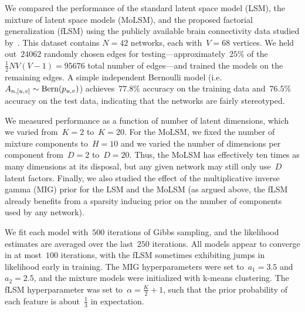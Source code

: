 We compared the performance of the standard latent space model (LSM),
the mixture of latent space models (MoLSM), and the proposed factorial
generalization (fLSM) using the publicly available brain connectivity
data studied by~\citet{durante2016nonparametric}. This dataset
contains ${N=42}$ networks, each with~${V=68}$ vertices.  We held
out~$24062$ randomly chosen edges for testing---approximately~$25\%$ of the
${\tfrac{1}{2}NV(V-1) = 95676}$ total number of edges---and trained
the models on the remaining edges. A simple independent Bernoulli model
(i.e.~${A_{n,[u,v]} \sim \mathrm{Bern}(p_{u,v})}$) achieves~$77.8\%$
accuracy on the training data and~$76.5\%$ accuracy on the test data,
indicating that the networks are fairly stereotyped.

We measured performance as a function of number of latent dimensions,
which we varied from~$K=2$ to~$K=20$.  For the MoLSM, we fixed the
number of mixture components to~${H=10}$ and we varied the number of
dimensions per component from~$D=2$ to~$D=20$.  Thus, the MoLSM has
effectively ten times as many dimensions at its disposal, but
any given network may still only use~$D$ latent factors. Finally, we also
studied the effect of the multiplicative inverse gamma (MIG) prior for the
LSM and the MoLSM (as argued above, the fLSM already benefits from a
sparsity inducing prior on the number of components used by any
network). 

We fit each model with~$500$ iterations of Gibbs sampling, and the likelihood
estimates are averaged over the last~$250$ iterations. All models
appear to converge in at most~$100$ iterations, with the fLSM
sometimes exhibiting jumps in likelihood  early in training.
The MIG hyperparameters were set to~$a_1=3.5$ and~$a_2=2.5$, and the
mixture models were initialized with k-means clustering. The fLSM
hyperparameter was set to~${\alpha = \tfrac{K}{2}+1}$, such that the
prior probability of each feature is about~$\tfrac{1}{3}$ in expectation.

